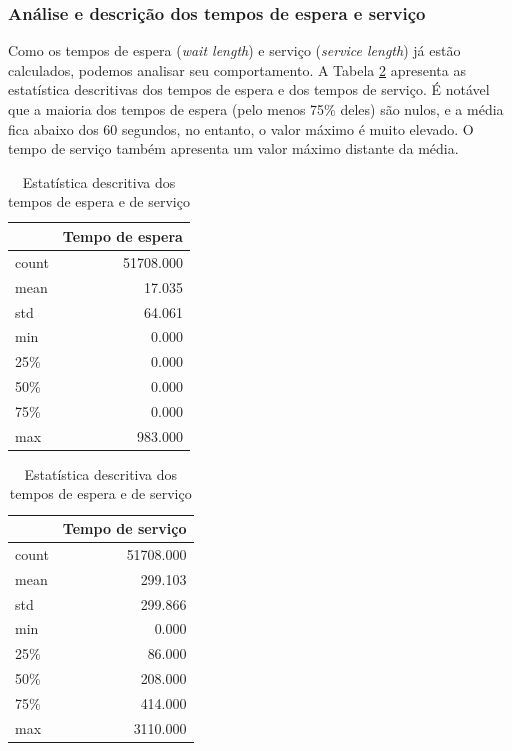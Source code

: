\subsubsection{Análise e descrição dos tempos de espera e serviço}
Como os tempos de espera (\textit{wait length}) e serviço (\textit{service length}) já estão calculados, podemos analisar seu comportamento. A Tabela \ref*{tab: descricao-serviço-espera} apresenta as estatística descritivas dos tempos de espera e dos tempos de serviço. É notável que a maioria dos tempos de espera (pelo menos 75\% deles) são nulos, e a média fica abaixo dos 60 segundos, no entanto, o valor máximo é muito elevado. O tempo de serviço também apresenta um valor máximo distante da média.

\begin{table}[H]
\centering
    \begin{tabular}{lr}
            \toprule
            {} &  Tempo de espera \\
            \midrule
            count &   51708.000  \\
            mean  &      17.035  \\
            std   &      64.061  \\
            min   &       0.000  \\
            25\%   &       0.000  \\
            50\%   &       0.000  \\
            75\%   &       0.000  \\
            max   &     983.000  \\
        \bottomrule
    \end{tabular}
    \quad
    \begin{tabular}{lr}
            \toprule
            {} &  Tempo de serviço \\
            \midrule
            count &     51708.000   \\
            mean  &       299.103   \\
            std   &       299.866   \\
            min   &         0.000   \\
            25\%   &        86.000   \\
            50\%   &       208.000   \\
            75\%   &       414.000   \\
            max   &      3110.000   \\
        \bottomrule
    \end{tabular}
    \caption{Estatística descritiva dos tempos de espera e de serviço}
    \label{tab: descricao-serviço-espera}
\end{table}

